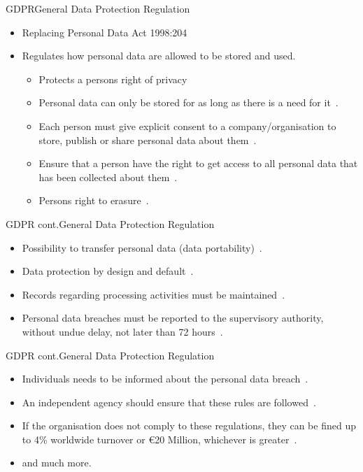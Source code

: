 \documentclass{beamer}
\begin{document}
\begin{frame}{GDPR}{General Data Protection Regulation}
  \begin{itemize}
    \item Replacing Personal Data Act 1998:204
    \item Regulates how personal data are allowed to be stored and used.
      \begin{itemize}
        \item Protects a persons right of privacy~\cite[art. 5]{eu:gdpr}
        \item Personal data can only be stored for as long as there is a need
          for it~\cite[art. 5]{eu:gdpr}.
        \item Each person must give explicit consent to a company/organisation
          to store, publish or share personal data about them~\cite[art.
          7]{eu:gdpr}.  
        \item Ensure that a person have the right to get access
          to all personal
          data that has been collected about them~\cite[art. 15]{eu:gdpr}.
        \item Persons right to erasure~\cite[art. 17]{eu:gdpr}. 
      \end{itemize}
  \end{itemize}
\end{frame}
\begin{frame}{GDPR cont.}{General Data Protection Regulation}
    \begin{itemize}
      \item Possibility to transfer personal data (data
          portability)~\cite[art. 20]{eu:gdpr}.  
      \item Data protection by design and default~\cite[art. 25]{eu:gdpr}.
      \item Records regarding processing activities must be maintained~\cite[art.
        30]{eu:gdpr}.
      \item Personal data breaches must be reported to the supervisory
        authority, without undue delay, not later than 72 hours~\cite[art.
        33]{eu:gdpr}.
    \end{itemize}
\end{frame}
\begin{frame}{GDPR cont.}{General Data Protection Regulation}
\begin{itemize}
    \item Individuals needs to be informed about the personal data
        breach~\cite[art. 34]{eu:gdpr}.
    \item An independent agency should ensure that these rules are 
      followed~\cite[art 51]{eu:gdpr}.
    \item If the organisation does not comply to these regulations, they can be
      fined up to 4\% worldwide turnover or \euro{}20 Million, whichever is 
      greater~\cite[art 83]{eu:gdpr}.
    \item and much more.
\end{itemize}
\end{frame}
\end{document}
